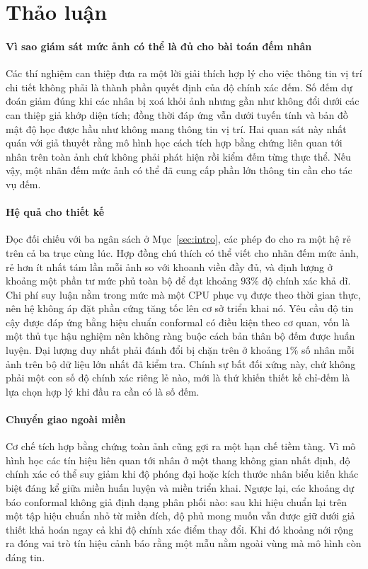 \documentclass[preprint,12pt]{elsarticle}
\begin{document}
\section{Thảo luận}\label{sec:discuss}

\paragraph{Vì sao giám sát mức ảnh có thể là đủ cho bài toán đếm nhân} Các thí nghiệm can thiệp đưa ra một lời
giải thích hợp lý cho việc thông tin vị trí chi tiết không phải là thành phần quyết định của độ chính xác đếm. Số
đếm dự đoán giảm đúng khi các nhân bị xoá khỏi ảnh nhưng gần như không đổi dưới các can thiệp giả khớp diện tích;
đồng thời đáp ứng vẫn dưới tuyến tính và bản đồ mật độ học được hầu như không mang thông tin vị trí. Hai quan sát
này nhất quán với giả thuyết rằng mô hình học cách tích hợp bằng chứng liên quan tới nhân trên toàn ảnh chứ không
phải phát hiện rồi kiểm đếm từng thực thể. Nếu vậy, một nhãn đếm mức ảnh có thể đã cung cấp phần lớn thông tin cần
cho tác vụ đếm.

\paragraph{Hệ quả cho thiết kế} Đọc đối chiếu với ba ngân sách ở Mục~\ref{sec:intro}, các phép đo cho ra một hệ
rẻ trên cả ba trục cùng lúc. Hợp đồng chú thích có thể viết cho nhãn đếm mức ảnh, rẻ hơn ít nhất tám lần mỗi ảnh
so với khoanh viền đầy đủ, và định lượng ở khoảng một phần tư mức phủ toàn bộ để đạt khoảng $93\%$ độ chính xác
khả dĩ. Chi phí suy luận nằm trong mức mà một CPU phục vụ được theo thời gian thực, nên hệ không áp đặt phần cứng
tăng tốc lên cơ sở triển khai nó. Yêu cầu độ tin cậy được đáp ứng bằng hiệu chuẩn conformal có điều kiện theo cơ
quan, vốn là một thủ tục hậu nghiệm nên không ràng buộc cách bản thân bộ đếm được huấn luyện. Đại lượng duy nhất
phải đánh đổi bị chặn trên ở khoảng $1\%$ số nhân mỗi ảnh trên bộ dữ liệu lớn nhất đã kiểm tra. Chính sự bất đối
xứng này, chứ không phải một con số độ chính xác riêng lẻ nào, mới là thứ khiến thiết kế chỉ-đếm là lựa chọn hợp
lý khi đầu ra cần có là số đếm.

\paragraph{Chuyển giao ngoài miền} Cơ chế tích hợp bằng chứng toàn ảnh cũng gợi ra một hạn chế tiềm tàng. Vì mô
hình học các tín hiệu liên quan tới nhân ở một thang không gian nhất định, độ chính xác có thể suy giảm khi độ
phóng đại hoặc kích thước nhân biểu kiến khác biệt đáng kể giữa miền huấn luyện và miền triển khai. Ngược lại, các
khoảng dự báo conformal không giả định dạng phân phối nào: sau khi hiệu chuẩn lại trên một tập hiệu chuẩn nhỏ từ
miền đích, độ phủ mong muốn vẫn được giữ dưới giả thiết khả hoán ngay cả khi độ chính xác điểm thay đổi. Khi đó
khoảng nới rộng ra đóng vai trò tín hiệu cảnh báo rằng một mẫu nằm ngoài vùng mà mô hình còn đáng tin.
\end{document}
